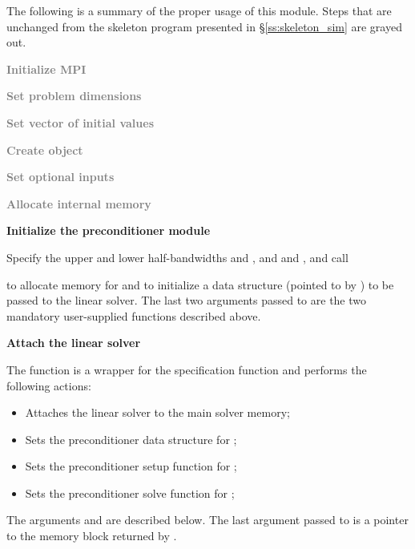 The following is a summary of the proper usage of this module. Steps that are
unchanged from the skeleton program presented in \S\ref{ss:skeleton_sim} are grayed out.
\begin{Steps}
\item 
  \textcolor{gray}{\bf Initialize MPI}

\item
  \textcolor{gray}{\bf Set problem dimensions}

\item
  \textcolor{gray}{\bf Set vector of initial values}
 
\item
  \textcolor{gray}{\bf Create {\cvodes} object}

\item
  \textcolor{gray}{\bf Set optional inputs}

\item
  \textcolor{gray}{\bf Allocate internal memory}

\item \label{i:bbdpre_init}
  {\bf Initialize the {\cvbbdpre} preconditioner module}

  Specify the upper and lower half-bandwidths  and , and
   and , and call 


  to allocate memory for and to initialize a data structure (pointed to by ) to be 
  passed to the {\cvspgmr} linear solver. The last two arguments passed to
   are the two mandatory user-supplied functions described above.

\item \label{i:bbdpre_attach}
  {\bf Attach the {\cvspgmr} linear solver}


  The function  is a wrapper for the {\cvspgmr} specification
  function  and performs the following actions:
  \begin{itemize}
    \item Attaches the {\cvspgmr} linear solver to the main {\cvodes} solver memory;
    \item Sets the preconditioner data structure for {\cvbbdpre};
    \item Sets the preconditioner setup function for {\cvbbdpre};
    \item Sets the preconditioner solve function for {\cvbbdpre};
  \end{itemize}
  The arguments  and  are described below.
  The last argument passed to  is a pointer to the {\cvbbdpre} memory block
  returned by .


\end{Steps}
